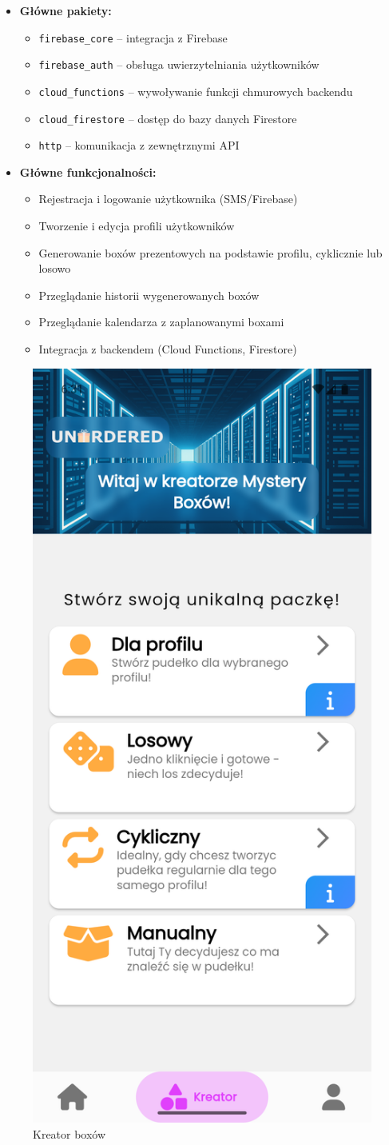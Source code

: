 \documentclass[a4paper, 12pt]{article}
\begin{document}
\begin{itemize}
    \item \textbf{Główne pakiety:}
    \begin{itemize}
        \item \texttt{firebase\_core} -- integracja z Firebase
        \item \texttt{firebase\_auth} -- obsługa uwierzytelniania użytkowników
        \item \texttt{cloud\_functions} -- wywoływanie funkcji chmurowych backendu
        \item \texttt{cloud\_firestore} -- dostęp do bazy danych Firestore
        \item \texttt{http} -- komunikacja z zewnętrznymi API
    \end{itemize}
    \item \textbf{Główne funkcjonalności:}
    \begin{itemize}
        \item Rejestracja i logowanie użytkownika (SMS/Firebase)
        \item Tworzenie i edycja profili użytkowników
        \item Generowanie boxów prezentowych na podstawie profilu, cyklicznie lub losowo
        \item Przeglądanie historii wygenerowanych boxów
        \item Przeglądanie kalendarza z zaplanowanymi boxami
        \item Integracja z backendem (Cloud Functions, Firestore)
    \end{itemize}
\end{itemize}
\begin{figure}[H]
    \centering
    \includegraphics[width=0.3\linewidth,keepaspectratio]{images/box_creator.png}
    \caption{Kreator boxów}
    \label{fig:box-creator}
\end{figure}
\end{document}
